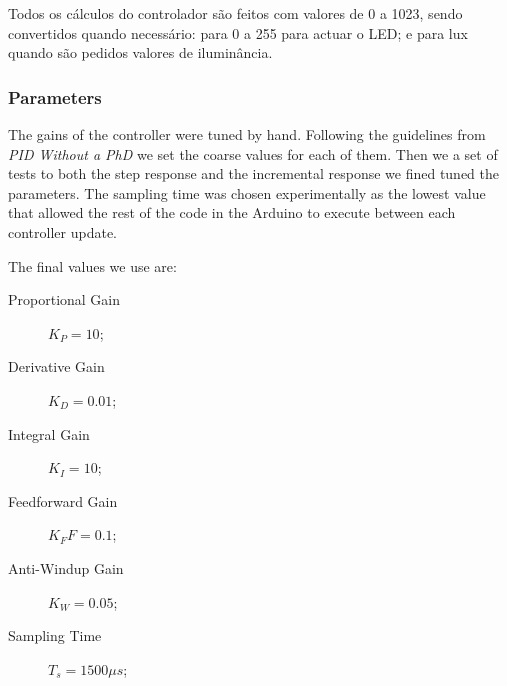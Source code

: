 Todos os cálculos do controlador são feitos com valores de 0 a 1023, sendo convertidos quando necessário: para 0 a 255 para actuar o LED; e para lux quando são pedidos valores de iluminância.

\subsubsection{Parameters}
\label{sub:Parameters}

The gains of the controller were tuned by hand.
Following the guidelines from \emph{PID Without a PhD} \cite{PIDWhitoutPhD} we set the coarse values for each of them.
Then we a set of tests to both the step response and the incremental response we fined tuned the parameters.
The sampling time was chosen experimentally as the lowest value that allowed the rest of the code in the Arduino to execute between each controller update.

The final values we use are:
\begin{description}
    \item[Proportional Gain] $K_P = 10$;
    \item[Derivative Gain] $K_D = 0.01$;
    \item[Integral Gain] $K_I = 10$;
    \item[Feedforward Gain] $K_FF = 0.1$;
    \item[Anti-Windup Gain] $K_W = 0.05$;
    \item[Sampling Time] $T_s = 1500 \mu s$;
\end{description}
